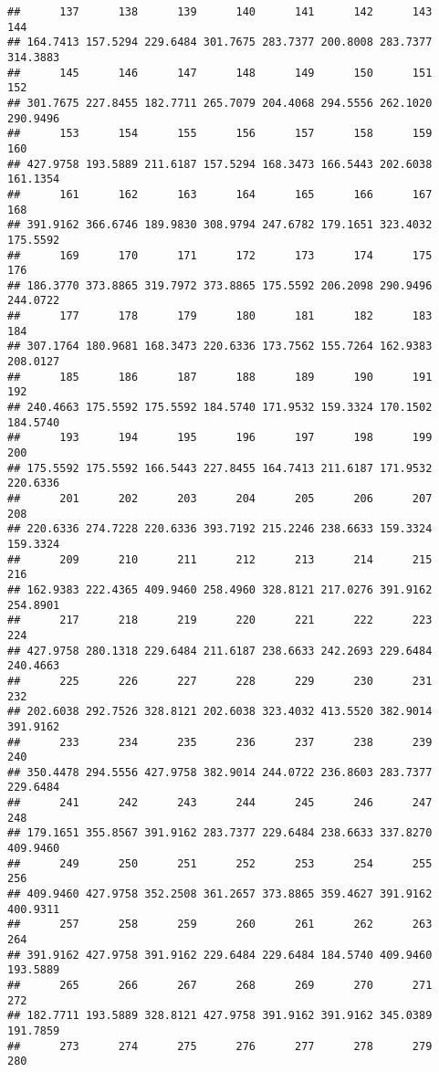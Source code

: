 \documentclass[
]{article}
\begin{document}
\begin{verbatim}
##      137      138      139      140      141      142      143      144 
## 164.7413 157.5294 229.6484 301.7675 283.7377 200.8008 283.7377 314.3883 
##      145      146      147      148      149      150      151      152 
## 301.7675 227.8455 182.7711 265.7079 204.4068 294.5556 262.1020 290.9496 
##      153      154      155      156      157      158      159      160 
## 427.9758 193.5889 211.6187 157.5294 168.3473 166.5443 202.6038 161.1354 
##      161      162      163      164      165      166      167      168 
## 391.9162 366.6746 189.9830 308.9794 247.6782 179.1651 323.4032 175.5592 
##      169      170      171      172      173      174      175      176 
## 186.3770 373.8865 319.7972 373.8865 175.5592 206.2098 290.9496 244.0722 
##      177      178      179      180      181      182      183      184 
## 307.1764 180.9681 168.3473 220.6336 173.7562 155.7264 162.9383 208.0127 
##      185      186      187      188      189      190      191      192 
## 240.4663 175.5592 175.5592 184.5740 171.9532 159.3324 170.1502 184.5740 
##      193      194      195      196      197      198      199      200 
## 175.5592 175.5592 166.5443 227.8455 164.7413 211.6187 171.9532 220.6336 
##      201      202      203      204      205      206      207      208 
## 220.6336 274.7228 220.6336 393.7192 215.2246 238.6633 159.3324 159.3324 
##      209      210      211      212      213      214      215      216 
## 162.9383 222.4365 409.9460 258.4960 328.8121 217.0276 391.9162 254.8901 
##      217      218      219      220      221      222      223      224 
## 427.9758 280.1318 229.6484 211.6187 238.6633 242.2693 229.6484 240.4663 
##      225      226      227      228      229      230      231      232 
## 202.6038 292.7526 328.8121 202.6038 323.4032 413.5520 382.9014 391.9162 
##      233      234      235      236      237      238      239      240 
## 350.4478 294.5556 427.9758 382.9014 244.0722 236.8603 283.7377 229.6484 
##      241      242      243      244      245      246      247      248 
## 179.1651 355.8567 391.9162 283.7377 229.6484 238.6633 337.8270 409.9460 
##      249      250      251      252      253      254      255      256 
## 409.9460 427.9758 352.2508 361.2657 373.8865 359.4627 391.9162 400.9311 
##      257      258      259      260      261      262      263      264 
## 391.9162 427.9758 391.9162 229.6484 229.6484 184.5740 409.9460 193.5889 
##      265      266      267      268      269      270      271      272 
## 182.7711 193.5889 328.8121 427.9758 391.9162 391.9162 345.0389 191.7859 
##      273      274      275      276      277      278      279      280 

\end{verbatim}
\end{document}
